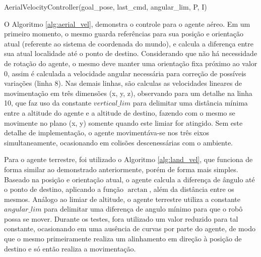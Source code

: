 \begin{algorithm}[h]
  \caption{AerialVelocityController(goal\_pose, last\_cmd, angular\_lim, P, I)}
  \label{alg:land_vel}
  \begin{algorithmic}[1]
    \STATE{}
    \STATE{}
    \ELSE
    \ENDIF
  \end{algorithmic}
\end{algorithm}

O Algoritmo \ref{alg:aerial_vel}, demonstra o controle para o agente aéreo.
Em um primeiro momento, o mesmo guarda referências para sua posição e orientação atual (referente ao sistema de coordenada do mundo), e calcula a diferença entre sua atual localidade até o ponto de destino.
Considerando que não há necessidade de rotação do agente, o mesmo deve manter uma orientação fixa próximo ao valor $0$, assim é calculada a velocidade angular necessária para correção de possíveis variações (linha $8$).
Nas demais linhas, são calculas as velocidades lineares de movimentação em três dimensões (x, y, z), observando para um detalhe na linha 10, que faz uso da constante $vertical\_lim$ para delimitar uma distância mínima entre a altitude do agente e a altitude de destino, fazendo com o mesmo se movimente no plano (x, y) somente quando este limiar for atingido.
Sem este detalhe de implementação, o agente movimentáva-se nos três eixos simultaneamente, ocasionando em colisões descenessárias com o ambiente.

Para o agente terrestre, foi utilizado o Algoritmo \ref{alg:land_vel}, que funciona de forma similar ao demonstrado anteriormente, porém de forma mais simples. Baseado na posição e orientação atual, o agente calcula a diferença de ângulo até o ponto de destino, aplicando a função $\arctan$, além da distância entre os mesmos.
Análogo ao limiar de altitude, o agente terrestre utiliza a constante $angular\_lim$ para delimitar uma diferença de angulo mínimo para que o robô possa se mover. Durante os testes, fora utilizado um valor reduzido para tal constante, ocasionando em uma ausência de curvas por parte do agente, de modo que o mesmo primeiramente realiza um alinhamento em direção à posição de destino e só então realiza a movimentação.

